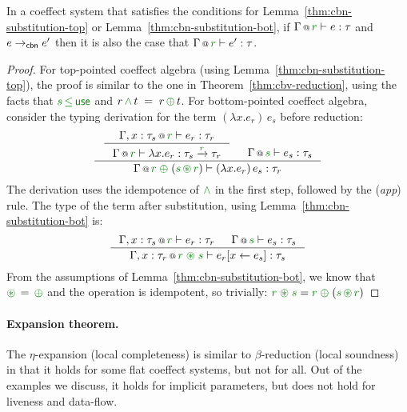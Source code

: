 \begin{theorem}
\label{thm:cbn-flat}
In a coeffect system that satisfies the conditions for Lemma~\ref{thm:cbn-substitution-top} or
Lemma~\ref{thm:cbn-substitution-bot}, if $\coctx{\Gamma}{\cclrd{r}} \vdash e : \tau$ 
and $e \rightarrow_{\textnormal{\sffamily cbn}} e'$ then it is also the case that $\coctx{\Gamma}{\cclrd{r}} \vdash e' : \tau$.
\end{theorem}
\begin{proof}

For top-pointed coeffect algebra (using Lemma~\ref{thm:cbn-substitution-top}), the proof is similar
to the one in Theorem~\ref{thm:cbv-reduction}, using the facts that $\cclrd{s} \,\cleq\, \cunit$
and $r \,\czip\, t \;=\; r \,\cpar\, t$.
For bottom-pointed coeffect algebra, consider the typing derivation for the term
$(\lambda x.e_r)\,e_s$ before reduction:
%
\begin{equation*}
\inference
  { \inference
      {\coctx{\Gamma, x:\tau_s}{\cclrd{r}} \vdash e_r : \tau_r}
      {\coctx{\Gamma}{\cclrd{r}} \vdash \lambda x.e_r : \tau_s \xrightarrow{\cclrd{r}} \tau_r } &
   \coctx{\Gamma}{\cclrd{s}} \vdash e_s : \tau_s }
  {\coctx{\Gamma}{\cclrd{r} \;\cpar\; (\cclrd{s} \,\cseq\, \cclrd{r})} \vdash (\lambda x.e_r)\,e_s : \tau_r }
\end{equation*}
%
The derivation uses the idempotence of $\czip$ in the first step, followed by the 
(\emph{app}) rule. The type of the term after substitution, using Lemma~\ref{thm:cbn-substitution-bot} is:
%
\begin{equation*}
\inference
  { \coctx{\Gamma, x:\tau_s}{\cclrd{r}} \vdash e_r : \tau_r & 
    \coctx{\Gamma}{\cclrd{s}} \vdash e_s : \tau_s }
  { \coctx{\Gamma, x:\tau_r}{\cclrd{r}\;\cseq\;\cclrd{s}} \vdash \subst{e_r}{x}{e_s} : \tau_s }
\end{equation*}
%
From the assumptions of Lemma~\ref{thm:cbn-substitution-bot}, we know that $\cseq\,=\,\cpar$
and the operation is idempotent, so trivially:
$\cclrd{r}\;\cseq\;\cclrd{s} = \cclrd{r} \;\cpar\; (\cclrd{s} \,\cseq\, \cclrd{r})$
\end{proof}

\paragraph{Expansion theorem.}
The $\eta$-expansion (local completeness) is similar to $\beta$-reduction (local soundness) in that
it holds for some flat coeffect systems, but not for all. Out of the examples we discuss, it 
holds for implicit parameters, but does not hold for liveness and data-flow.

